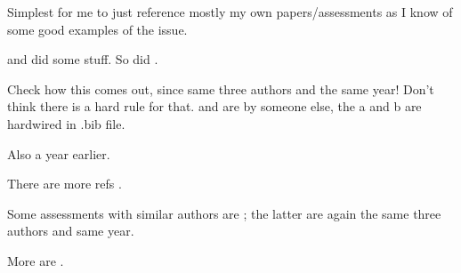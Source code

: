 \documentclass[11pt]{book}
\newcommand{\fishname}{Pacific Ocean Perch}
\begin{document}

Simplest for me to just reference mostly my own papers/assessments as I know of
some good examples of the issue. 

\citet{eb96} and \citet{eb99} did some stuff. So did \citet{eb01}. 

Check how this comes out, since same three authors and the same year! Don't think
there is a hard rule for that.
\citet{ebp00a} and \citet{ebp00b} are by someone else, the a and b are hardwired in .bib file.

Also \citet{epb00} a year earlier.

There are more refs \citep{edwa01, edwa08, efbj12}.

Some assessments with similar authors are \citet{ehs12, ehs14area3CD, ehs14area5DE}; the latter are again the same three authors and same year.

More are \citet{ehs15, eps02, epw01, esh12, erpbb17}.



\end{document}
